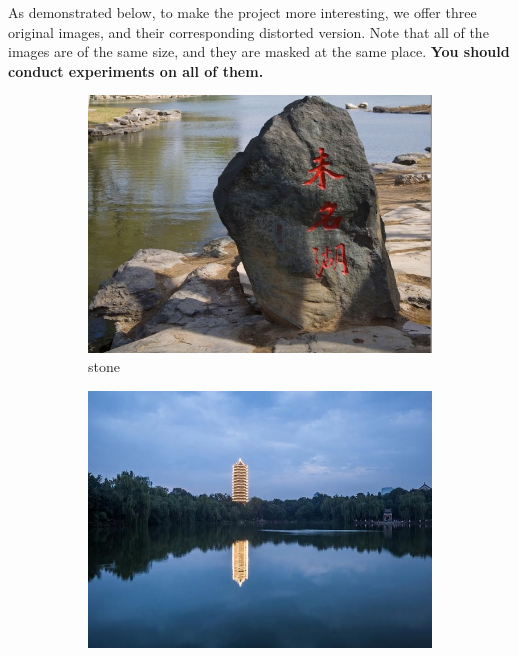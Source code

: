 \documentclass[11pt]{article}
\begin{document}
 As demonstrated below, to make the project more interesting, we offer three original images, and their corresponding distorted version. Note that all of the images are of the same size, and they are masked at the same place. \textbf{You should conduct experiments on all of them.}
 \begin{figure}[ht!]
    \centering
    \hfill%
    \begin{subfigure}[]{0.333\linewidth}
        \centering
        \includegraphics[width=\linewidth]{fig/stone_ori.jpg}
        \caption{stone}
    \end{subfigure}%
    \hfill%
    \begin{subfigure}[]{0.333\linewidth}
        \centering
        \includegraphics[width=\linewidth]{fig/sce_ori.jpg}

\end{subfigure}
\end{figure}
\end{document}
